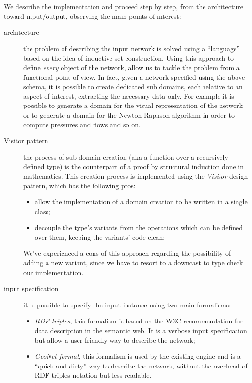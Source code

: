 \documentclass[twoside,openright,titlepage,fleqn,
headinclude,11pt,a4paper,BCOR5mm,footinclude ]{scrbook}
\begin{document}
We describe the implementation and proceed step by step, from the architecture
toward input/output, observing the main points of interest:
\begin{description}
\item[architecture] the problem of describing the input network is solved using
a ``language'' based on the idea of inductive set construction. 
Using this approach to define \emph{every} object of the network,
allow us to tackle the problem from a functional point of view. In fact, given a
network specified using the above schema, it is possible to create dedicated
sub domains, each relative to an aspect of interest, extracting the
necessary data only. For example it
is possible to generate a domain for the visual representation of the network or
to generate a domain for the Newton-Raphson algorithm in order to compute
pressures and flows and so on.

\item[Visitor pattern]
the process of sub domain creation (aka a function over a recursively defined
type) is the counterpart of a proof by structural
induction done in mathematics. This creation process is implemented using the
\emph{Visitor} design pattern, which has the following pros:
\begin{itemize}
	\item allow the implementation of a domain creation to be written in a
		single class;
	\item decouple the type's variants from the operations which can be 
		defined over them, keeping the variants' code clean;
\end{itemize}
We've experienced a cons of this approach regarding the possibility of adding a
new variant, since we have to resort to a downcast to type check our implementation.

\item[input specification] it is possible to specify the input instance using
two main formalisms:
\begin{itemize}
	\item \emph{RDF triples}, this formalism is based on the W3C
		recommendation for data description in the semantic web. It is a
		verbose input specification but allow a user friendly way to
		describe the network;
	\item \emph{GeoNet format}, this formalism is used by the existing
		engine and is a ``quick and dirty'' way to describe the network,
		without the overhead of RDF triples notation but less
		readable.
\end{itemize}


\end{description}
\end{document}
